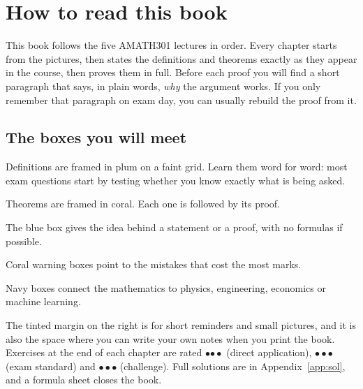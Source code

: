 \chapter*{How to read this book}

This book follows the five AMATH301 lectures in order. Every chapter starts from the
pictures, then states the definitions and theorems exactly as they appear in the course,
then proves them in full. Before each proof you will find a short paragraph that says,
in plain words, \emph{why} the argument works. If you only remember that paragraph on exam
day, you can usually rebuild the proof from it.

\section*{The boxes you will meet}

\begin{tcolorbox}[corners=plum,colback=plumtint,bpgridbg=lavgrey!70,title=Definition]
Definitions are framed in plum on a faint grid. Learn them word for word: most exam
questions start by testing whether you know exactly what is being asked.
\end{tcolorbox}

\begin{tcolorbox}[corners=coral,colback=coraltint,bpgridbg=coral!10,title=Theorem]
Theorems are framed in coral. Each one is followed by its proof.
\end{tcolorbox}

\begin{intuition}
The blue box gives the idea behind a statement or a proof, with no formulas if possible.
\end{intuition}

\begin{trap}
Coral warning boxes point to the mistakes that cost the most marks.
\end{trap}

\begin{reallife}{}
Navy boxes connect the mathematics to physics, engineering, economics or machine learning.
\end{reallife}

The tinted margin on the right is for short reminders and small pictures, and it is
also the space where you can write your own notes when you print the book. Exercises at
the end of each chapter are rated
{\color{coral}$\bullet$}{\color{lavgrey}$\bullet\bullet$} (direct application),
{\color{coral}$\bullet\bullet$}{\color{lavgrey}$\bullet$} (exam standard) and
{\color{coral}$\bullet\bullet\bullet$} (challenge). Full solutions are in
Appendix~\ref{app:sol}, and a formula sheet closes the book.

